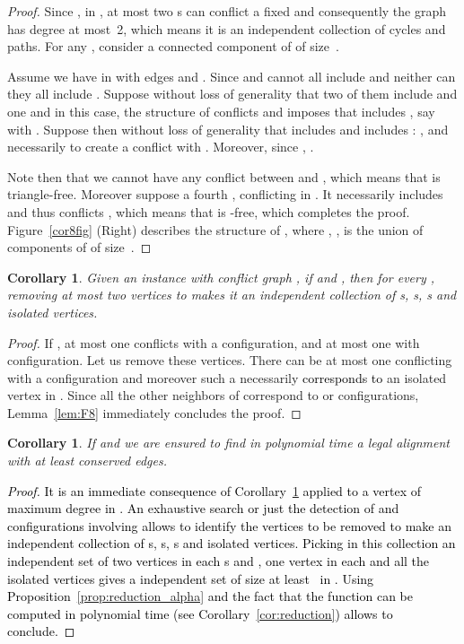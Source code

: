 \documentclass[final]{dmtcs-episciences}
\newtheorem{corollary}[theorem]{Corollary}
\newcommand\mar[1]{\textcolor{black}{#1}}
\begin{document}
\begin{proof}
Since , in , at most two s   can conflict a fixed  and consequently the graph  has degree at most~2, which means it is an independent  collection of cycles and paths. For any , consider a connected component of  of size~. 

Assume we have  in  with edges  and . Since   and   cannot all include  and neither can they all include .  Suppose without loss of generality that two of them include  and one  and in this case, the structure of conflicts  and  imposes that  includes , say  with . Suppose then without loss of generality that  includes  and  includes : ,  and necessarily  to create a conflict with . Moreover, since , .

Note then that we cannot have any conflict between  and , which means that  is triangle-free. Moreover suppose a fourth ,  conflicting  in . It necessarily includes  and thus conflicts , which means that  is -free, which completes the proof. Figure~\ref{cor8fig} (Right) describes the structure of , where , , is the union of components of  of size~.
\end{proof}





\begin{corollary}\label{polalg1}
Given an instance  with conflict graph , if  and , then for every , removing at most two vertices to  makes it an independent collection of s, s, s and isolated vertices. 
\end{corollary}
\begin{proof} 
If , at most one  conflicts   with a    configuration, and 
at most one with   configuration. Let us remove these vertices.  There can be at most one  conflicting  with a   configuration and moreover such a  necessarily \mar{corresponds to} an isolated vertex in . Since all the other neighbors of  correspond to    or  configurations,  Lemma~\ref{lem:F8} immediately concludes the proof.   
\end{proof}

\begin{corollary}\label{rem:degree}
If  and  we are ensured to find in polynomial time a legal alignment with at least 
 conserved edges.
\end{corollary}

\mar{\begin{proof}
It is an immediate consequence of Corollary~\ref{polalg1} applied to a vertex  of maximum degree in . An exhaustive search or just the detection of   and 
 configurations involving  allows to identify the vertices to be removed to make  an independent collection of s, s, s and isolated vertices. Picking in this collection an independent set of two vertices in each   s and , one vertex in each  and all the isolated vertices gives a independent set of size at least~ in . Using Proposition~\ref{prop:reduction_alpha} and the fact that the function  can be computed in polynomial time (see Corollary~\ref{cor:reduction}) allows to conclude. 
\end{proof}}
\end{document}
